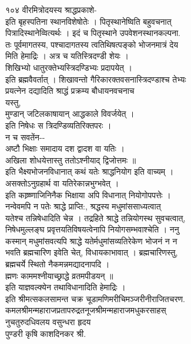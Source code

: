 \documentclass[11pt, openany]{book}
\begin{document}
{{{{{{{{{{{{{{{{{{{{{{{{{{{{{{{{{{{{{{{{{{{{{{{{{{{{{{{{{{{{{{{{{{{{{{{{{{{{{{{{{{{{{{{{{{{{{{{{{{{{{{{{{{{{{{{{{{{{{{{{{{{{{{{{{{{{{{{{{{{{{{{{{{{{{{{{{{{{{{{{{{{१०४ }{वीरमित्रोदयस्य श्राद्धप्रकाशे-}{\\
इति बृहस्पतिना स्थानविशेषोतेः । पितृस्थानेष्विति बहुवचनात्\\
पित्रादिस्थानेव्वित्यर्थः । इदं च पितृस्थाने उपवेशनस्थानकल्पना.\\
तः पूर्वमागतस्य, पश्चादागतस्य त्वतिथिषत्पङ्को भोजनमात्रं देय\\
मिति हेमाद्रिः । अत्र च यतिस्त्रिदण्डी शेयः ।\\
शिखिभ्यो धातुरक्तेभ्यस्त्रिदण्डिभ्यः प्रदापयेत् ।\\
इति ब्रह्मवैवर्तात् । शिखावन्तो गैरिकारक्तवसनास्त्रिदण्डाश्च तेभ्यः\\
प्रयत्नेन दद्यादिति श्राद्धं प्रक्रम्य बौधायनवचनाच \textbar{}\\
यस्तु,\\
मुण्डान् जटिलकाषायान् आद्धकाले विवर्जयेत् ।\\
इति निषेधः स त्रिदण्डिव्यतिरिक्तपरः ।\\
न च सवतेंन-\/-\\
अष्टौ भिक्षाः समादाय दश द्वादश वा यतिः ।\\
अखिला शोधयेत्तास्तु ततोऽश्नीयाद् द्विजोत्तमः ॥\\
इति भैक्ष्यभोजनविधानात् कथं यतेः श्राद्धनियोग इति वाच्यम् ।\\
असक्तोऽनुग्रहार्थ वा यतिरेकान्नभुग्भवेत् ।\\
इति काष्र्ष्णाजिनिनैक भिक्षाया अपि विधानात् नियोगोपपत्तेः ।\\
नन्वेवमपि न पतेः श्राद्धे प्राप्ति:, श्रद्धस्य मधुमांससाध्यत्वात्\\
यतेश्च तन्निषेधादिति चेन्न । तद्रहिते श्राद्धे तन्नियोगस्थ सुवचत्वात्,\\
निषेधमुल्लङ्घ प्रवृत्तयतिविषयत्वेनापि नियोगसम्भवाश्चेति । ननु\\
कस्मान् मधुमांसवत्यपि श्राद्धे यतेर्मधुमांसव्यतिरेकेण भोजनं न न\\
भवति ब्रह्मचारिण इवेति चेत्, विधायकाभावात् । ब्रह्मचारिणस्तु,\\
ब्रह्मचर्ये स्थितो नैकमन्नमद्यादनापदि ।\\
ह्मणः काममश्नीयाच्छ्राद्धे व्रतमपीडयन् ॥\\
इति याज्ञवल्क्येन तथाविधानादिति हेमाद्रिः ।\\
इति श्रीमत्सकलसामन्त चक्र चूडामणिमरीचिमञ्जरीनीराजितचरण.\\
कमलश्रीमन्महाराजप्रतापरुद्रतनूजश्रीमन्महाराजमधुकरसाहस्\\
नुचतुरुदधिवलय वसुन्धरा हृदय\\
पुण्डरी कृषि काशदिनकर श्री.\\
}}}}}}}}}}}}}}}}}}}}}}}}}}}}}}}}}}}}}}}}}}}}}}}}}}}}}}}}}}}}}}}}}}}}}}}}}}}}}}}}}}}}}}}}}}}}}}}}}}}}}}}}}}}}}}}}}}}}}}}}}}}}}}}}}}}}}}}}}}}}}}}}}}}}}}}}}}}}}}}}}}}
\end{document}
